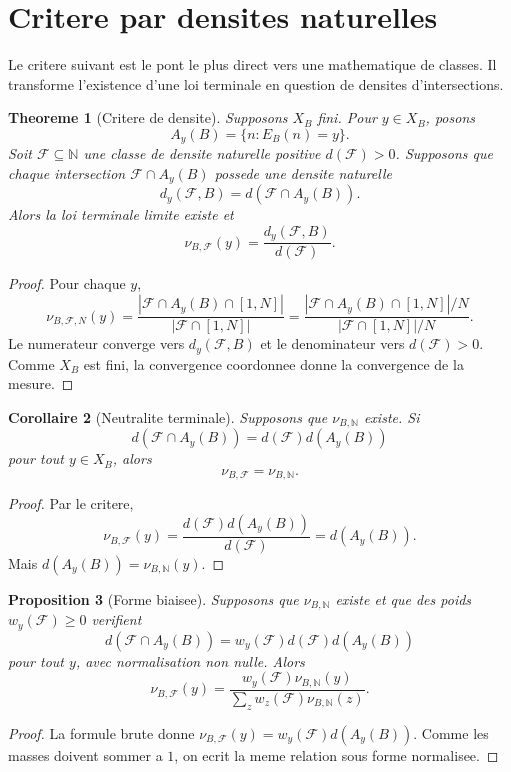 \documentclass[11pt]{article}
\theoremstyle{plain}
\newtheorem{theorem}{Theoreme}[section]
\newtheorem{proposition}[theorem]{Proposition}
\newtheorem{corollary}[theorem]{Corollaire}
\theoremstyle{definition}
\theoremstyle{remark}
\newcommand{\N}{\mathbb N}
\newcommand{\1}{\mathbf 1}
\newcommand{\F}{\mathcal F}
\begin{document}
\section{Critere par densites naturelles}

Le critere suivant est le pont le plus direct vers une mathematique de classes.
Il transforme l'existence d'une loi terminale en question de densites
d'intersections.

\begin{theorem}[Critere de densite]
Supposons \(X_B\) fini. Pour \(y\in X_B\), posons
\[
A_y(B)=\{n:E_B(n)=y\}.
\]
Soit \(\F\subseteq\N\) une classe de densite naturelle positive \(d(\F)>0\).
Supposons que chaque intersection \(\F\cap A_y(B)\) possede une densite
naturelle
\[
d_y(\F,B)=d(\F\cap A_y(B)).
\]
Alors la loi terminale limite existe et
\[
\nu_{B,\F}(y)=\frac{d_y(\F,B)}{d(\F)}.
\]
\end{theorem}

\begin{proof}
Pour chaque \(y\),
\[
\nu_{B,\F,N}(y)=
\frac{|\F\cap A_y(B)\cap[1,N]|}{|\F\cap[1,N]|}
=
\frac{|\F\cap A_y(B)\cap[1,N]|/N}{|\F\cap[1,N]|/N}.
\]
Le numerateur converge vers \(d_y(\F,B)\) et le denominateur vers \(d(\F)>0\).
Comme \(X_B\) est fini, la convergence coordonnee donne la convergence de la
mesure.
\end{proof}

\begin{corollary}[Neutralite terminale]
Supposons que \(\nu_{B,\N}\) existe. Si
\[
d(\F\cap A_y(B))=d(\F)d(A_y(B))
\]
pour tout \(y\in X_B\), alors
\[
\nu_{B,\F}=\nu_{B,\N}.
\]
\end{corollary}

\begin{proof}
Par le critere,
\[
\nu_{B,\F}(y)=\frac{d(\F)d(A_y(B))}{d(\F)}=d(A_y(B)).
\]
Mais \(d(A_y(B))=\nu_{B,\N}(y)\).
\end{proof}

\begin{proposition}[Forme biaisee]
Supposons que \(\nu_{B,\N}\) existe et que des poids \(w_y(\F)\ge0\) verifient
\[
d(\F\cap A_y(B))=w_y(\F)d(\F)d(A_y(B))
\]
pour tout \(y\), avec normalisation non nulle. Alors
\[
\nu_{B,\F}(y)=
\frac{w_y(\F)\nu_{B,\N}(y)}
{\sum_z w_z(\F)\nu_{B,\N}(z)}.
\]
\end{proposition}

\begin{proof}
La formule brute donne \(\nu_{B,\F}(y)=w_y(\F)d(A_y(B))\). Comme les masses
doivent sommer a \(1\), on ecrit la meme relation sous forme normalisee.
\end{proof}
\end{document}
